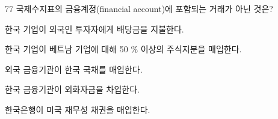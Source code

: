 \begin{question}{77}
국제수지표의 금융계정(financial account)에 포함되는 거래가 아닌 것은?
\begin{choices}
  \item 한국 기업이 외국인 투자자에게 배당금을 지불한다.
  \item 한국 기업이 베트남 기업에 대해 50 \% 이상의 주식지분을 매입한다.
  \item 외국 금융기관이 한국 국채를 매입한다.
  \item 한국 금융기관이 외화자금을 차입한다.
  \item 한국은행이 미국 재무성 채권을 매입한다.
\end{choices}
\end{question}
